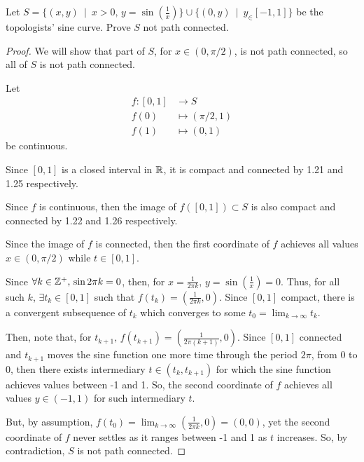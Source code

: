 \documentclass[../quiz3]{subfiles}
\begin{document}
\begin{problem}[1]
Let $S=\{(x,y)\ \mid\ x>0,\, y=\sin\left( \frac{1}{x} \right) \} \cup \{(0,y)\ \mid\ y_\in [-1,1]\} $ be the topologists' sine curve. Prove $S$ not path connected.
\end{problem}
\begin{proof}
	We will show that part of $S$, for $x \in (0,\pi / 2)$, is not path connected, so all of $S$ is not path connected.

	Let
	\begin{align*}
		f : [0,1] & \longrightarrow S        \\
		f(0)      & \longmapsto (\pi / 2, 1) \\
		f(1)      & \longmapsto (0,1)
	\end{align*}
	be continuous.

	Since $[0,1]$ is a closed interval in $\mathbb{R}$, it is compact and connected by 1.21 and 1.25 respectively.

	Since $f$ is continuous, then the image of $f([0,1])\subset S$ is also compact and connected by 1.22 and 1.26 respectively.

	Since the image of  $f$ is connected, then the first coordinate of $f$ achieves all values $x \in (0,\pi /2)$ while $t\in [0,1]$.

	Since $\forall k\in \mathbb{Z}^{+},\, \sin 2\pi k = 0$, then, for $x=\frac{1}{2\pi k},\, y=\sin\left( \frac{1}{x} \right) =0$.
	Thus, for all such $k$,  $\exists t_k\in [0,1]$ such that $f(t_k)=\left( \frac{1}{2\pi k}, 0 \right) $.
	Since $[0,1]$ compact, there is a convergent subsequence of $t_k$ which converges to some  $t_0=\lim_{k \to \infty} t_k$.

	Then, note that, for $t_{k+1},\, f(t_{k+1})=\left( \frac{1}{2\pi(k+1)},0 \right) $. Since $[0,1]$ connected and  $t_{k+1}$ moves the sine function one more time through the period $2\pi$, from 0 to 0, then there exists intermediary $t\in (t_k,t_{k+1})$ for which the sine function achieves values between -1 and 1. So, the second coordinate of $f$ achieves all values  $y \in (-1,1)$ for such intermediary $t$.

	But, by assumption, $f(t_0)=\lim_{k \to \infty} \left( \frac{1}{2\pi k},0 \right) =(0,0)$, yet the second coordinate of $f$ never settles as it ranges between -1 and 1 as  $t$ increases. So, by contradiction,  $S$ is not path connected.
\end{proof}
\end{document}
